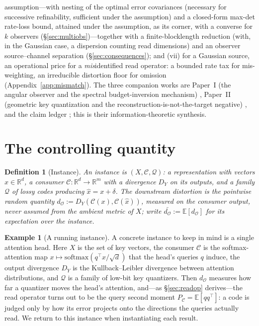 \documentclass[11pt]{article}
\newtheorem{definition}{Definition}
\theoremstyle{definition}
\newtheorem{example}{Example}
\theoremstyle{remark}
\newcommand{\PC}{P_{\mathcal{C}}}
\newcommand{\dO}{d_{\mathcal{O}}}
\newcommand{\E}{\mathbb{E}}
\newcommand{\R}{\mathbb{R}}
\begin{document}
assumption---with nesting of the optimal error covariances (necessary for successive
refinability, sufficient under the assumption) and a closed-form max-det rate-loss bound,
attained under the assumption, as its corner, with a converse for $k$ observers
(\S\ref{sec:multiobs})---together with a finite-blocklength reduction (with, in the
Gaussian case, a dispersion counting read dimensions) and an observer source--channel
separation (\S\ref{sec:consequences}); and (vii) for a Gaussian source, an operational
price for a \emph{mis}identified read operator: a bounded rate tax for mis-weighting, an
irreducible distortion floor for omission (Appendix~\ref{app:mismatch}).
The three companion works are Paper~I (the angular observer and the spectral
budget-inversion mechanism) \cite{paper1}, Paper~II (geometric key quantization and
the reconstruction-is-not-the-target negative) \cite{paper2}, and the claim ledger
\cite{ledger2026}; this is their information-theoretic synthesis.

\section{The controlling quantity}\label{sec:framework}

\begin{definition}[Instance]
An instance is $(X,\mathcal{C},\mathcal{Q})$: a representation with vectors
$x\in\R^{d}$, a \emph{consumer} $\mathcal{C}:\R^{d}\to\R^m$ with a divergence $D_Y$
on its outputs, and a family $\mathcal{Q}$ of lossy codes producing $\hat x=x+\delta$.
The downstream distortion is the pointwise random quantity
$\dO:=D_Y(\mathcal{C}(x),\mathcal{C}(\hat x))$, measured on the consumer output, never
assumed from the ambient metric of $X$; write $\bar{\dO}:=\E[\dO]$ for its expectation
over the instance.
\end{definition}

\begin{example}[A running instance]\label{ex:head}
A concrete instance to keep in mind is a single attention head. Here $X$ is the set of
key vectors, the consumer $\mathcal{C}$ is the softmax-attention map
$x\mapsto\mathrm{softmax}(q^\top x/\sqrt d)$ that the head's queries $q$ induce, the
output divergence $D_Y$ is the Kullback--Leibler divergence between attention
distributions, and $\mathcal{Q}$ is a family of low-bit key quantizers. Then $\dO$
measures how far a quantizer moves the head's attention, and---as \S\ref{sec:readop}
derives---the read operator turns out to be the query second moment
$\PC=\E[qq^\top]$: a code is judged only by how its error projects onto the directions
the queries actually read. We return to this instance when instantiating each result.
\end{example}
\end{document}
